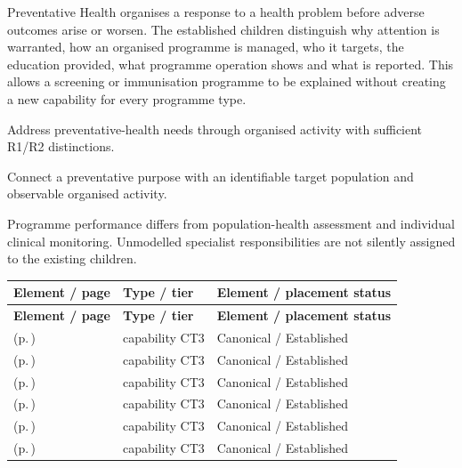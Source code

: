 Preventative Health organises a response to a health problem before adverse outcomes arise or worsen. The established children distinguish why attention is warranted, how an organised programme is managed, who it targets, the education provided, what programme operation shows and what is reported. This allows a screening or immunisation programme to be explained without creating a new capability for every programme type.



Address preventative-health needs through organised activity with sufficient R1/\allowbreak{}R2 distinctions.



Connect a preventative purpose with an identifiable target population and observable organised activity.



Programme performance differs from population-health assessment and individual clinical monitoring. Unmodelled specialist responsibilities are not silently assigned to the existing children.


\begingroup\small\setlength{\TableWidth}{\dimexpr\linewidth-6\tabcolsep-4\arrayrulewidth\relax}
\begin{longtable}{|>{\raggedright\arraybackslash}p{0.52\TableWidth}|>{\raggedright\arraybackslash}p{0.2\TableWidth}|>{\raggedright\arraybackslash}p{0.28\TableWidth}|}
\hline\rowcolor{TableHead}\textbf{Element / page} & \textbf{Type / tier} & \textbf{Element / placement status}\\\hline\endfirsthead
\hline\rowcolor{TableHead}\textbf{Element / page} & \textbf{Type / tier} & \textbf{Element / placement status}\\\hline\endhead
\hline\endfoot
\nameref{cap:bc-preventative-health-problem-identification} (p.\,\pageref{cap:bc-preventative-health-problem-identification}) & capability CT3 & Canonical / Established\\\hline
\nameref{cap:bc-preventative-health-programme-management} (p.\,\pageref{cap:bc-preventative-health-programme-management}) & capability CT3 & Canonical / Established\\\hline
\nameref{cap:bc-preventative-health-education-services} (p.\,\pageref{cap:bc-preventative-health-education-services}) & capability CT3 & Canonical / Established\\\hline
\nameref{cap:bc-preventative-health-programme-monitoring} (p.\,\pageref{cap:bc-preventative-health-programme-monitoring}) & capability CT3 & Canonical / Established\\\hline
\nameref{cap:bc-preventative-health-reporting} (p.\,\pageref{cap:bc-preventative-health-reporting}) & capability CT3 & Canonical / Established\\\hline
\nameref{cap:bc-preventative-health-cohort-management} (p.\,\pageref{cap:bc-preventative-health-cohort-management}) & capability CT3 & Canonical / Established\\\hline
\end{longtable}\endgroup

